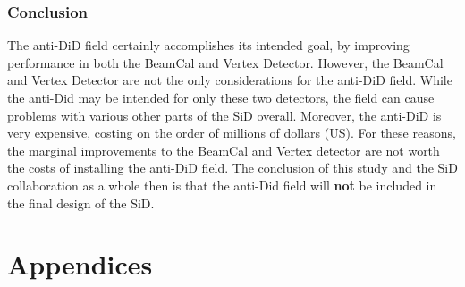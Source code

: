 \documentclass{report}
\begin{document}
            \subsection{Conclusion}
                The anti-DiD field certainly accomplishes its intended goal, by improving performance in both the BeamCal and Vertex Detector. However, the BeamCal and Vertex Detector are not the only considerations for the anti-DiD field. While the anti-Did may be intended for only these two detectors, the field can cause problems with various other parts of the SiD overall. Moreover, the anti-DiD is very expensive, costing on the order of millions of dollars (US). For these reasons, the marginal improvements to the BeamCal and Vertex detector are not worth the costs of installing the anti-DiD field. The conclusion of this study and the SiD collaboration as a whole then is that the anti-Did field will \textbf{not} be included in the final design of the SiD.





    \chapter{Appendices}
\end{document}
